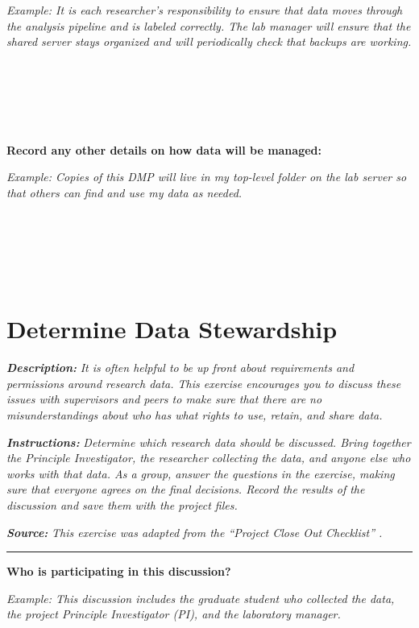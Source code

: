 \documentclass[
]{book}
\begin{document}
\emph{Example: It is each researcher's responsibility to ensure that data moves through the analysis pipeline and is labeled correctly. The lab manager will ensure that the shared server stays organized and will periodically check that backups are working.}

~

~

~

\textbf{Record any other details on how data will be managed:}

\emph{Example: Copies of this DMP will live in my top-level folder on the lab server so that others can find and use my data as needed.}

~

~

~

\hypertarget{data-governance}{%
\section{Determine Data Stewardship}\label{data-governance}}

\textbf{\emph{Description:}} \emph{It is often helpful to be up front about requirements and permissions around research data. This exercise encourages you to discuss these issues with supervisors and peers to make sure that there are no misunderstandings about who has what rights to use, retain, and share data.}

\textbf{\emph{Instructions:}} \emph{Determine which research data should be discussed. Bring together the Principle Investigator, the researcher collecting the data, and anyone else who works with that data. As a group, answer the questions in the exercise, making sure that everyone agrees on the final decisions. Record the results of the discussion and save them with the project files.}

\textbf{\emph{Source:}} \emph{This exercise was adapted from the ``Project Close Out Checklist'' \citep{briney_project_2020}.}

\begin{center}\rule{0.5\linewidth}{0.5pt}\end{center}

\textbf{Who is participating in this discussion?}

\emph{Example: This discussion includes the graduate student who collected the data, the project Principle Investigator (PI), and the laboratory manager.}

~

~
\end{document}

